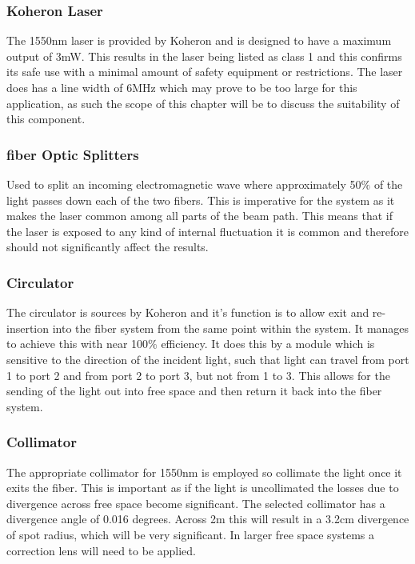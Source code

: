 \documentclass[12pt,a4paper,oneside]{report}
\begin{document}
\subsubsection{Koheron Laser}
The 1550nm laser \cite{KoheronLaserV1} is provided by Koheron and is designed to have a maximum output of 3mW. This results in the laser being listed as class 1 and this confirms its safe use with a minimal amount of safety equipment or restrictions. The laser does has a line width of 6MHz which may prove to be too large for this application, as such the scope of this chapter will be to discuss the suitability of this component.

\subsubsection{fiber Optic Splitters}
Used to split an incoming electromagnetic wave \cite{1x2Koheron} where approximately 50$\%$ of the light passes down each of the two fibers. This is imperative for the system as it makes the laser common among all parts of the beam path. This means that if the laser is exposed to any kind of internal fluctuation it is common and therefore should not significantly affect the results.

\subsubsection{Circulator}
The circulator \cite{FiberKoheron} is sources by Koheron and it's function is to allow exit and re-insertion into the fiber system from the same point within the system. It manages to achieve this with near 100$\%$ efficiency. It does this by a module which is sensitive to the direction of the incident light, such that light can travel from port 1 to port 2 and from port 2 to port 3, but not from 1 to 3. This allows for the sending of the light out into free space and then return it back into the fiber system.

\subsubsection{Collimator}
The appropriate collimator \cite{Air-SpacedSMA} for 1550nm is employed so collimate the light once it exits the fiber. This is important as if the light is uncollimated the losses due to divergence across free space become significant. The selected collimator has a divergence angle of 0.016 degrees. Across 2m this will result in a 3.2cm divergence of spot radius, which will be very significant. In larger free space systems a correction lens will need to be applied.
\end{document}
